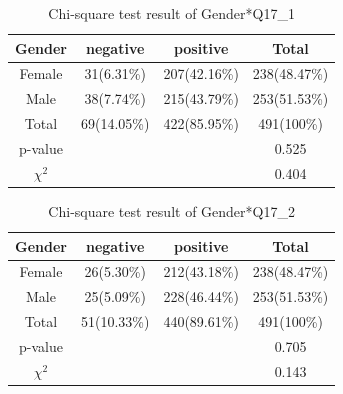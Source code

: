 \begin{table}[h]
  \caption{Chi-square test result of Gender*Q17\_1 }
  \label{table31a}
  \centering
\begin{tabular}{c|ccc}
\hline
Gender & negative & positive & Total \\
\hline
Female & 31(6.31\%)                           & 207(42.16\%)                          & 238(48.47\%)                       \\
Male   & 38(7.74\%)                         & 215(43.79\%)                          & 253(51.53\%)                       \\
Total  & 69(14.05\%)                         & 422(85.95\%)                          & 491(100\%)                       \\
\hline
p-value      &        &      & 0.525   \\
$\chi^2$      &        &      & 0.404   \\
\hline                   
\end{tabular}
\end{table}

\begin{table}[h]
  \vspace{-0.2cm}
  \caption{Chi-square test result of Gender*Q17\_2 }
  \label{table31b}
  \centering
\begin{tabular}{c|ccc}
\hline
Gender & negative & positive & Total \\
\hline
Female & 26(5.30\%)                           & 212(43.18\%)                          & 238(48.47\%)                       \\
Male   & 25(5.09\%)                          & 228(46.44\%)                         & 253(51.53\%)                       \\
Total  & 51(10.33\%)                           & 440(89.61\%)                          & 491(100\%)                       \\
\hline
p-value      &        &      & 0.705   \\
$\chi^2$      &        &      & 0.143  \\
\hline                   
\end{tabular}
\end{table}

